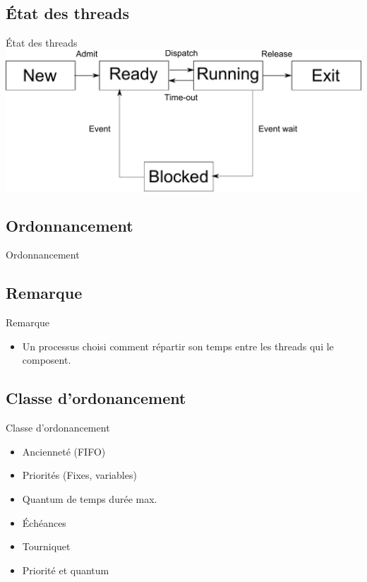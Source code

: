 \def\sectitle{État des threads}
\subsection{\sectitle}
\begin{frame}{\sectitle}
    \includegraphics[width=\textwidth]{../images/StateSimple.pdf}
\end{frame}


\def\sectitle{Ordonnancement}
\subsection{\sectitle}
\begin{frame}{\sectitle}
\def\subsectitle{Remarque}
\subsection{\subsectitle}
\begin{block}{\subsectitle}
\begin{itemize}
    \item Un processus choisi comment répartir son temps entre les threads qui
        le composent. 
\end{itemize}
\end{block}
\def\subsectitle{Classe d'ordonancement}
\subsection{\subsectitle}
\begin{block}{\subsectitle}
\begin{itemize}
    \item Ancienneté (FIFO)
    \item Priorités (Fixes, variables)
    \item Quantum de temps durée max.
    \item Échéances
    \item Tourniquet
    \item Priorité et quantum
\end{itemize}
\end{block}
\end{frame}

